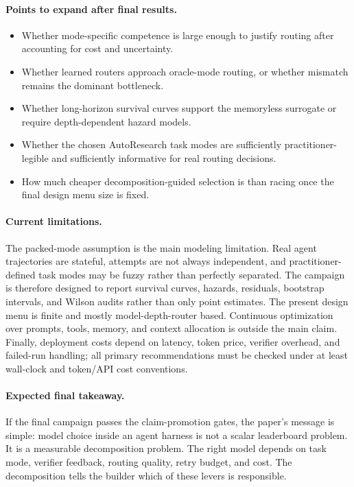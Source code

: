 \documentclass{article}
\begin{document}
\paragraph{Points to expand after final results.}
\begin{itemize}[leftmargin=1.4em,itemsep=0.15em]
  \item Whether mode-specific competence is large enough to justify routing after accounting for cost and uncertainty.
  \item Whether learned routers approach oracle-mode routing, or whether mismatch remains the dominant bottleneck.
  \item Whether long-horizon survival curves support the memoryless surrogate or require depth-dependent hazard models.
  \item Whether the chosen AutoResearch task modes are sufficiently practitioner-legible and sufficiently informative for real routing decisions.
  \item How much cheaper decomposition-guided selection is than racing once the final design menu size is fixed.
\end{itemize}

\paragraph{Current limitations.}
The packed-mode assumption is the main modeling limitation.
Real agent trajectories are stateful, attempts are not always independent, and practitioner-defined task modes may be fuzzy rather than perfectly separated.
The campaign is therefore designed to report survival curves, hazards, residuals, bootstrap intervals, and Wilson audits rather than only point estimates.
The present design menu is finite and mostly model-depth-router based.
Continuous optimization over prompts, tools, memory, and context allocation is outside the main claim.
Finally, deployment costs depend on latency, token price, verifier overhead, and failed-run handling; all primary recommendations must be checked under at least wall-clock and token/API cost conventions.

\paragraph{Expected final takeaway.}
If the final campaign passes the claim-promotion gates, the paper's message is simple: model choice inside an agent harness is not a scalar leaderboard problem.
It is a measurable decomposition problem.
The right model depends on task mode, verifier feedback, routing quality, retry budget, and cost.
The decomposition tells the builder which of these levers is responsible.
\end{document}
